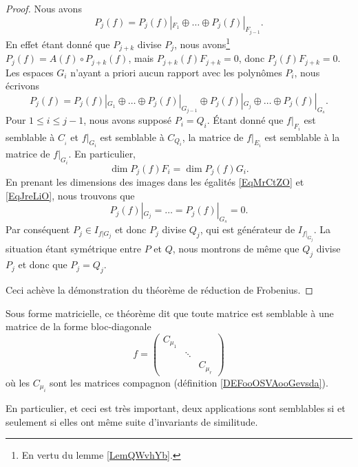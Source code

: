 \begin{proof}
    Nous avons 
    \begin{equation}    \label{EqMrCtZO}
        P_j(f)=P_j(f)|_{F_1}\oplus\ldots\oplus P_j(f)|_{F_{j-1}}.
    \end{equation}
    En effet étant donné que \( P_{j+k}\) divise \( P_j\), nous avons\footnote{En vertu du lemme \ref{LemQWvhYb}.} \( P_{j}(f)=A(f)\circ P_{j+k}(f)\), mais \( P_{j+k}(f)F_{j+k}=0\), donc \( P_j(f)F_{j+k}=0\). Les espaces \( G_i\) n'ayant a priori aucun rapport avec les polynômes \( P_i\), nous écrivons
    \begin{equation}    \label{EqJreLiO}
        P_j(f)=P_j(f)|_{G_1}\oplus\ldots\oplus P_j(f)|_{G_{j-1}}\oplus P_j(f)|_{G_j}\oplus\ldots\oplus P_j(f)|_{G_s}.
    \end{equation}
    Pour \( 1\leq i\leq j-1\), nous avons supposé \( P_i=Q_i\). Étant donné que \( f|_{F_i}\) est semblable à \( C_{_i}\) et \( f|_{G_i}\) est semblable à \( C_{Q_i}\), la matrice de \( f|_{E_i}\) est semblable à la matrice de \( f|_{G_i}\). En particulier,
    \begin{equation}
        \dim P_j(f)F_i=\dim P_j(f)G_i.
    \end{equation}
    En prenant les dimensions des images dans les égalités \eqref{EqMrCtZO} et \eqref{EqJreLiO}, nous trouvons que
    \begin{equation}
        P_j(f)|_{G_j}=\ldots=P_j(f)|_{G_s}=0.
    \end{equation}
    Par conséquent \( P_j\in I_{f|G_j}\) et donc \( P_j\) divise \( Q_j\), qui est générateur de \( I_{f|_{G_j}}\). La situation étant symétrique entre \( P\) et \( Q\), nous montrons de même que \( Q_j\) divise \( P_j\) et donc que \( P_j=Q_j\).

    Ceci achève la démonstration du théorème de réduction de Frobenius.

\end{proof}

\begin{remark}      \label{REMooPVLEooYDRXQI}
    Sous forme matricielle, ce théorème dit que toute matrice est semblable à une matrice de la forme bloc-diagonale
    \begin{equation}
        f=\begin{pmatrix}
            C_{\mu_1}    &       &       \\
                &   \ddots    &       \\
                &       &   C_{\mu_r}
        \end{pmatrix}
    \end{equation}
    où les \( C_{\mu_i}\) sont les matrices compagnon (définition \ref{DEFooOSVAooGevsda}). 

    En particulier, et ceci est très important, deux applications sont semblables si et seulement si elles ont même suite d'invariants de similitude.
\end{remark}


